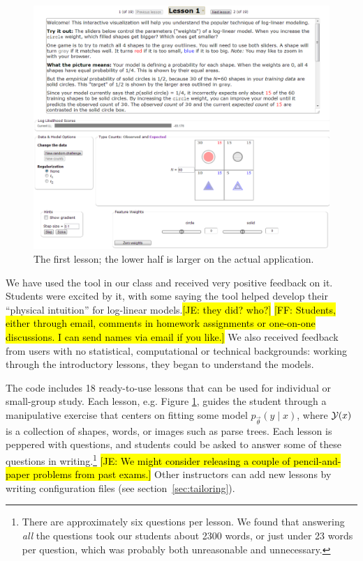\documentclass[11pt,letterpaper]{article}
\newcommand{\Note}[1]{}
\renewcommand{\Note}[1]{\hl{[#1]}}  %
\newcommand{\NoteSigned}[3]{{\sethlcolor{#2}\Note{#1: #3}}}
\newcommand{\NoteFF}[1]{\NoteSigned{FF}{LightBlue}{#1}}
\newcommand{\NoteJE}[1]{\NoteSigned{JE}{LightGreen}{#1}}
\newcommand{\Commented}[1]{#1}
\newcommand{\NumLessons}[0]{18}%
\begin{document}
\begin{figure}
\centering
\includegraphics[scale=.49]{images/lesson1-051313-intro-zoom-instmore.PNG}
\caption{The first lesson; the lower half is larger on the actual
  application.
}
\label{fig:lesson1}
\end{figure}

We have used the tool in our class and received very positive feedback on it. 
Students were excited by it, with some saying the tool helped develop their 
``physical intuition'' for log-linear models.\NoteJE{they did? who?}  
\NoteFF{Students, either through email, comments in homework assignments 
or one-on-one discussions. I can send names via email if you like.}
We also received feedback from users 
with no statistical, computational or technical backgrounds: working through the introductory 
lessons, they began to understand the models.

The code includes \NumLessons{} ready-to-use lessons that can be used
for individual or small-group study.  Each lesson, e.g. Figure \ref{fig:lesson1}, guides the student
through a manipulative exercise that centers on fitting some model
$p_{\vec{\theta}}(y \mid x)$, where ${\cal Y}(x)$ is a collection of
shapes, words, or images such as parse trees.  Each lesson is peppered
with questions, and students could be asked to answer some of these
questions in writing.\footnote{There are approximately six questions per
lesson. We found that answering {\em all} the
  questions took our students about 2300 words, or just under 23 words per question, which
  was probably both unreasonable and unnecessary.}
\Commented{\NoteJE{We might
  consider releasing a couple of pencil-and-paper problems from past
  exams.}}  Other instructors can add new lessons by writing 
configuration files (see section~\ref{sec:tailoring}).
\end{document}

